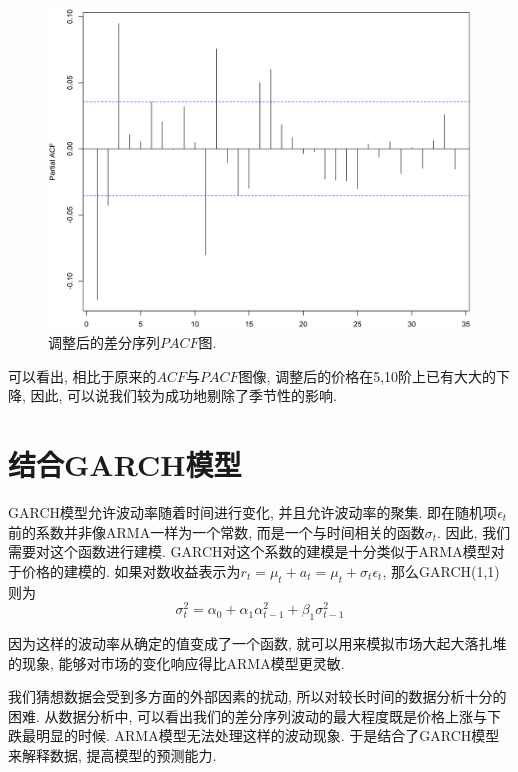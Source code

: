 \documentclass[12pt]{article}
\begin{document}
\begin{center}
\begin{minipage}{0.45\textwidth}
\begin{figure}
            \hspace{-25pt}\includegraphics[width=.95\textwidth]{pacf2}
            \caption{调整后的差分序列$PACF$图.\label{fig:12}}
        \end{figure}
    \end{minipage}
\end{center}

\qquad 可以看出, 相比于原来的$ACF$与$PACF$图像, 调整后的价格在5,10阶上已有大大的下降, 因此, 可以说我们较为成功地剔除了季节性的影响. 
\section{结合GARCH模型}
\qquad GARCH模型允许波动率随着时间进行变化, 并且允许波动率的聚集. 即在随机项$\epsilon_t$前的系数并非像ARMA一样为一个常数, 而是一个与时间相关的函数$\sigma_t$. 因此, 我们需要对这个函数进行建模. GARCH对这个系数的建模是十分类似于ARMA模型对于价格的建模的. 如果对数收益表示为$r_t=\mu_t+a_t=\mu_t+\sigma_t\epsilon_t$, 那么GARCH(1,1)则为
\begin{equation*}
\sigma_t^2=\alpha_0+\alpha_1\alpha_{t-1}^2+\beta_1\sigma^2_{t-1}
\end{equation*}

\qquad 因为这样的波动率从确定的值变成了一个函数, 就可以用来模拟市场大起大落扎堆的现象, 能够对市场的变化响应得比ARMA模型更灵敏.

\qquad 我们猜想数据会受到多方面的外部因素的扰动, 所以对较长时间的数据分析十分的困难. 从数据分析中, 可以看出我们的差分序列波动的最大程度既是价格上涨与下跌最明显的时候. ARMA模型无法处理这样的波动现象. 于是结合了GARCH模型来解释数据, 提高模型的预测能力. 
\end{document}
